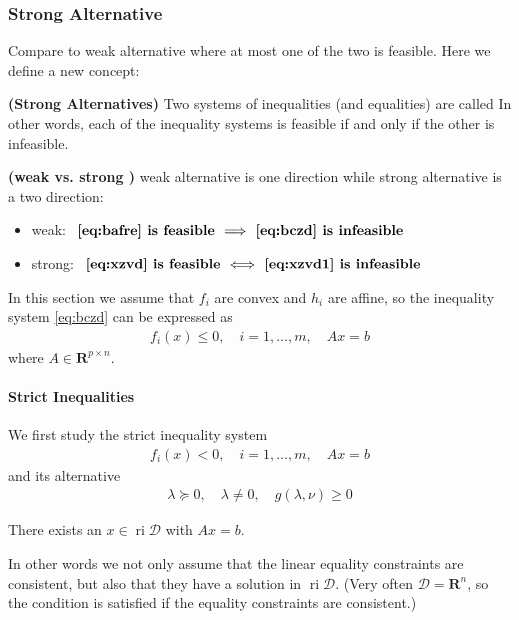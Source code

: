 \documentclass{article}
\newcommand{\bfs}[1]{\textbf{({#1}) }}
\newcommand{\ri}{\operatorname{ri}}
\begin{document}
\subsubsection{Strong Alternative}\label{sec:bmqdfd}
Compare to weak alternative where  at most one of the two is feasible. Here we define a new concept:
\begin{defa}\bfs{Strong Alternatives}
Two systems of inequalities (and equalities) are called  In other words, each of the inequality systems is feasible if and only if the other is infeasible.
\end{defa}
\begin{rema}\bfs{weak vs. strong }
weak alternative is one direction while strong alternative is a two direction:
\begin{itemize}
    \item weak: $ \textbf{ \cref{eq:bafre} is feasible }   \Longrightarrow \textbf{ \cref{eq:bczd} is infeasible}$ %
    \item strong: $ \textbf{ \cref{eq:xzvd} is feasible }  \Longleftrightarrow \textbf{ \cref{eq:xzvd1} is infeasible}$ %
\end{itemize}
\end{rema}

In this section we assume that $f_{i}$ are convex and $h_{i}$ are affine, so the inequality system \cref{eq:bczd} can be expressed as
\begin{align}
f_{i}(x) \leq 0, \quad i=1, \ldots, m, \quad A x=b\label{eq:sefdas}
\end{align}
where $A \in \mathbf{R}^{p \times n}$.
\paragraph{Strict Inequalities}
We first study the strict inequality system
\begin{align}
f_{i}(x)<0, \quad i=1, \ldots, m, \quad A x=b\label{eq:xzvd}
\end{align}
and its alternative
\begin{align}
\lambda \succeq 0, \quad \lambda \neq 0, \quad g(\lambda, \nu) \geq 0\label{eq:xzvd1}
\end{align}

 There exists an $x \in \ri \mathcal{D}$ with $A x=b$. 

In other words we not only assume that the linear equality constraints are consistent, but also that they have a solution in $\ri \mathcal{D}$. (Very often $\mathcal{D}=\mathbf{R}^{n}$, so the condition is satisfied if the equality constraints are consistent.)  
\end{document}
